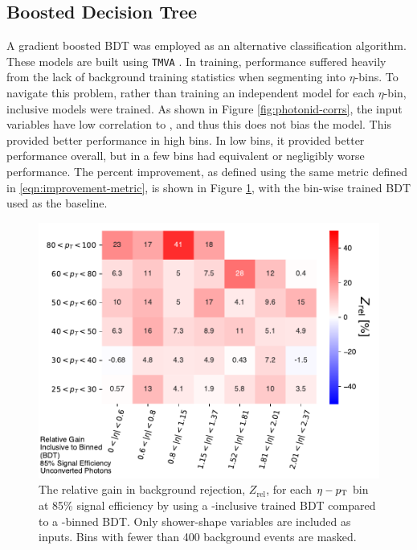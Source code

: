\subsection{Boosted Decision Tree}\label{ssec:yid-bdt}

A gradient boosted \gls{BDT} was employed as an alternative classification algorithm. These models are built using \texttt{TMVA} \cite{TMVA}. In training, performance suffered heavily from the lack of background training statistics when segmenting into $\eta$-\pt bins. To navigate this problem, rather than training an independent model for each $\eta$-\pt bin, \pt inclusive models were trained. As shown in Figure \ref{fig:photonid-corrs}, the input variables have low correlation to \pt, and thus this does not bias the model. This provided better performance in high \pt bins. In low \pt bins, it provided better performance overall, but in a few bins had equivalent or negligibly worse performance. The percent improvement, as defined using the same metric defined in \ref{eqn:improvement-metric}, is shown in Figure \ref{fig:bdtinclusive-vs-bdt}, with the bin-wise trained \gls{BDT} used as the baseline.

\begin{figure}[!htb]
    \centering
    \includegraphics[width=.85\textwidth]{chapters/chapter4_photonID/images/BDTInclusive_v_BDT_normed.pdf}
    \caption[The relative gain in background rejection by using a \pt-inclusive trained \gls{BDT} compared to a \pt-binned \gls{BDT}]
    {The relative gain in background rejection, $Z_{\text{rel}}$, for each $\eta-p_{\text{T}}$ bin at 85\% signal efficiency by using a \pt-inclusive trained \gls{BDT} compared to a \pt-binned \gls{BDT}. Only shower-shape variables are included as inputs. Bins with fewer than 400 background events are masked.}
    \label{fig:bdtinclusive-vs-bdt}
\end{figure}


